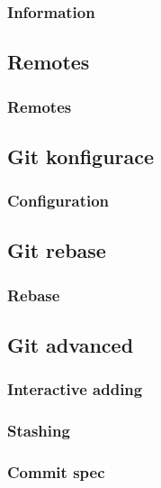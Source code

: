 
\begin{frame}
	\frametitle{Information}
\end{frame}


\subsection{Remotes}


\begin{frame}
	\frametitle{Remotes}
\end{frame}


\subsection{Git konfigurace}

% 

\begin{frame}
	\frametitle{Configuration}
\end{frame}


\subsection{Git rebase}


\begin{frame}
	\frametitle{Rebase}
\end{frame}


\subsection{Git advanced}

\begin{frame}
	\frametitle{Interactive adding}
\end{frame}

\begin{frame}
	\frametitle{Stashing}
\end{frame}

\begin{frame}
	\frametitle{Commit spec}
\end{frame}


